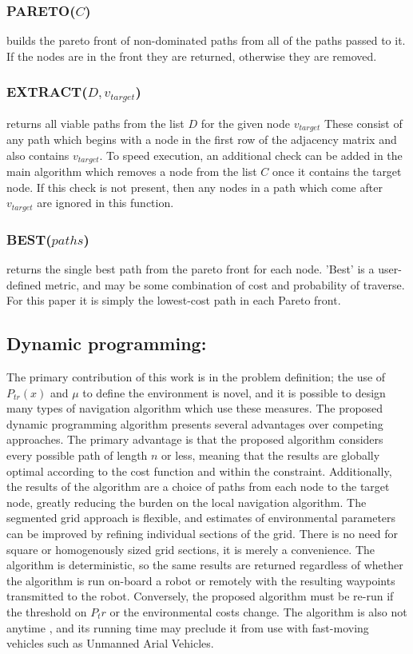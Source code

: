 \documentclass[journal]{IEEEtran}
\begin{document}
\subsubsection{PARETO($C$)} builds the pareto front of non-dominated paths from all of the paths passed to it. If the nodes are in the front they are returned, otherwise they are removed.
\subsubsection{EXTRACT($D, v_{target}$)} returns all viable paths from the list $D$ for the given node $v_{target}$
These consist of any path which begins with a node in the first row of the adjacency matrix and also contains $v_{target}$. 
To speed execution, an additional check can be added in the main algorithm which removes a node from the list $C$ once it contains the target node. 
If this check is not present, then any nodes in a path which come after $v_{target}$ are ignored in this function.
\subsubsection{BEST($paths$)} returns the single best path from the pareto front for each node. 'Best' is a user-defined metric, and may be some combination of cost and probability of traverse. For this paper it is simply the lowest-cost path in each Pareto front.

\subsection{Dynamic programming:}
The primary contribution of this work is in the problem definition; the use of $P_{tr}(x)$ and $\mu$ to define the environment is novel, and it is possible to design many types of navigation algorithm which use these measures. 
The proposed dynamic programming algorithm presents several advantages over competing approaches.
The primary advantage is that the proposed algorithm considers every possible path of length $n$ or less, meaning that the results are globally optimal according to the cost function and within the constraint. 
Additionally, the results of the algorithm are a choice of paths from each node to the target node, greatly reducing the burden on the local navigation algorithm.
The segmented grid approach is flexible, and estimates of environmental parameters can be improved by refining individual sections of the grid. There is no need for square or homogenously sized grid sections, it is merely a convenience.
The algorithm is deterministic, so the same results are returned regardless of whether the algorithm is run on-board a robot or remotely with the resulting waypoints transmitted to the robot.
Conversely, the proposed algorithm must be re-run if the threshold on $P_tr$ or the environmental costs change. 
The algorithm is also not anytime \cite{definition of anytime}, and its running time may preclude it from use with fast-moving vehicles such as Unmanned Arial Vehicles.
\end{document}

